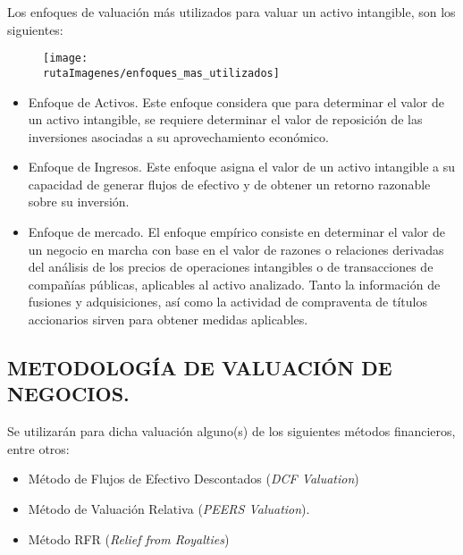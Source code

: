 \documentclass[5pt,letter]{article}
\begin{document}
Los enfoques de valuación más utilizados para valuar un activo intangible, son los
 siguientes:
 
 \begin{figure}[H]
 \centering
 \texttt{[image: \\rutaImagenes/enfoques\_mas\_utilizados]}
 \end{figure}
 
 \begin{itemize}
 
\item  Enfoque de Activos. Este enfoque considera que para determinar el valor de un activo intangible, se requiere determinar el valor de reposición de las inversiones asociadas a su aprovechamiento económico.
 

\item Enfoque de Ingresos. Este enfoque asigna el valor de un activo intangible a su capacidad
 de generar flujos de efectivo y de obtener un retorno razonable sobre su inversión.
 
\item  Enfoque de mercado. El enfoque empírico consiste en determinar el valor de un negocio en
marcha con base en el valor de razones o relaciones derivadas del análisis de los precios de
operaciones intangibles o de transacciones de compañías públicas, aplicables al activo
analizado. Tanto la información de fusiones y adquisiciones, así como la actividad de
compraventa de títulos accionarios sirven para obtener medidas aplicables.

\end{itemize}

 \begin{center}
 \section{METODOLOGÍA DE VALUACIÓN DE NEGOCIOS.}
 \end{center}
 
 Se utilizarán para dicha valuación alguno(s) de los siguientes métodos financieros, entre
otros:\\	
 
\begin{itemize}
\item Método de Flujos de Efectivo Descontados (\textit{DCF Valuation})
\item Método de Valuación Relativa (\textit{PEERS Valuation}).
\item Método RFR (\textit{Relief from Royalties})
\end{itemize}
\end{document}
